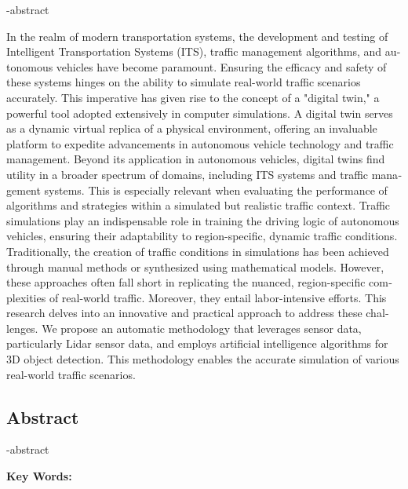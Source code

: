 
\en-abstract{
\begin{latin}
    In the realm of modern transportation systems, the development and testing of Intelligent Transportation Systems (ITS), traffic management algorithms, and autonomous vehicles have become paramount. Ensuring the efficacy and safety of these systems hinges on the ability to simulate real-world traffic scenarios accurately. This imperative has given rise to the concept of a "digital twin," a powerful tool adopted extensively in computer simulations.
    A digital twin serves as a dynamic virtual replica of a physical environment, offering an invaluable platform to expedite advancements in autonomous vehicle technology and traffic management. Beyond its application in autonomous vehicles, digital twins find utility in a broader spectrum of domains, including ITS systems and traffic management systems. This is especially relevant when evaluating the performance of algorithms and strategies within a simulated but realistic traffic context. Traffic simulations play an indispensable role in training the driving logic of autonomous vehicles, ensuring their adaptability to region-specific, dynamic traffic conditions.
    Traditionally, the creation of traffic conditions in simulations has been achieved through manual methods or synthesized using mathematical models. However, these approaches often fall short in replicating the nuanced, region-specific complexities of real-world traffic. Moreover, they entail labor-intensive efforts. This research delves into an innovative and practical approach to address these challenges. We propose an automatic methodology that leverages sensor data, particularly Lidar sensor data, and employs artificial intelligence algorithms for 3D object detection. This methodology enables the accurate simulation of various real-world traffic scenarios.
\end{latin}
}

\newpage
\thispagestyle{empty}
\begin{latin}
\section*{\LARGE\centering Abstract}

\een-abstract

\vspace*{.5cm}
{\large\textbf{Key Words:}}\par
\vspace*{.5cm}
\elatinkeywords
\end{latin}